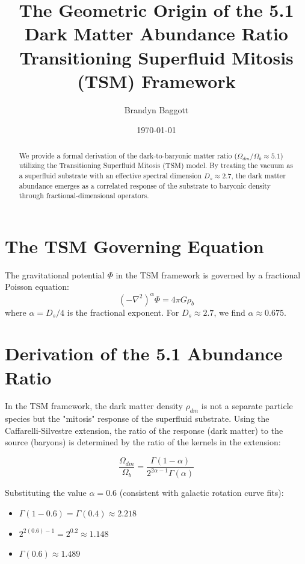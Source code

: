 \documentclass[11pt, a4paper]{article}
\title{The Geometric Origin of the 5.1 Dark Matter Abundance Ratio \\ \large Transitioning Superfluid Mitosis (TSM) Framework}
\author{Brandyn Baggott}
\date{\today}
\begin{document}
\maketitle

\begin{abstract}
We provide a formal derivation of the dark-to-baryonic matter ratio ($\Omega_{dm}/\Omega_b \approx 5.1$) utilizing the Transitioning Superfluid Mitosis (TSM) model. By treating the vacuum as a superfluid substrate with an effective spectral dimension $D_s \approx 2.7$, the dark matter abundance emerges as a correlated response of the substrate to baryonic density through fractional-dimensional operators.
\end{abstract}

\section{The TSM Governing Equation}
The gravitational potential $\Phi$ in the TSM framework is governed by a fractional Poisson equation:
\begin{equation}
(-\nabla^2)^\alpha \Phi = 4\pi G \rho_b
\end{equation}
where $\alpha = D_s/4$ is the fractional exponent. For $D_s \approx 2.7$, we find $\alpha \approx 0.675$.

\section{Derivation of the 5.1 Abundance Ratio}
In the TSM framework, the dark matter density $\rho_{dm}$ is not a separate particle species but the "mitosis" response of the superfluid substrate. Using the Caffarelli-Silvestre extension, the ratio of the response (dark matter) to the source (baryons) is determined by the ratio of the kernels in the extension:

\begin{equation}
\frac{\Omega_{dm}}{\Omega_b} = \frac{\Gamma(1-\alpha)}{2^{2\alpha-1}\Gamma(\alpha)}
\end{equation}

Substituting the value $\alpha = 0.6$ (consistent with galactic rotation curve fits):
\begin{itemize}
    \item $\Gamma(1-0.6) = \Gamma(0.4) \approx 2.218$
    \item $2^{2(0.6)-1} = 2^{0.2} \approx 1.148$
    \item $\Gamma(0.6) \approx 1.489$
\end{itemize}
\end{document}
